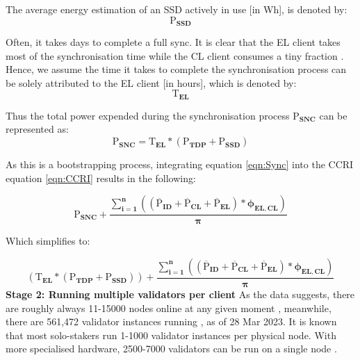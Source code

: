 The average energy estimation of an SSD actively in use [in Wh], is denoted by:
 \begin{equation*}
    \boldsymbol{\mathrm{P}_{SSD} } 
\end{equation*}

Often, it takes days to complete a full sync. It is clear that the EL client takes most of the synchronisation time while the CL client consumes a tiny fraction \cite{Ethereum/go-ethereum:Protocol}. Hence, we assume the time it takes to complete the synchronisation process can be solely attributed to the EL client [in hours], which is denoted by:
\begin{equation*}
    \boldsymbol{\mathrm{T}_{EL}}
\end{equation*}

Thus the total power expended during the synchronisation process $\boldsymbol{\mathrm{P}_{SNC}}$ can be represented as:
\begin{equation}
    \boldsymbol{\mathrm{P}_{SNC} = \mathrm{T}_{EL} * \left({\mathrm{P}_{TDP}} + \mathrm{P}_{SSD}\right)} \label{eqn:Sync}
\end{equation}

As this is a bootstrapping process, integrating equation \ref{eqn:Sync} into the CCRI equation \ref{eqn:CCRI} results in the following:

\begin{equation*}
    \boldsymbol{\mathrm{P}_{SNC} +  {\frac{\displaystyle\sum\limits_{i=1}^{n}{ \left({\left(\mathrm{\overline{P}}_{ID} + \mathrm{\overline{P}}_{CL} + \mathrm{\overline{P}}_{EL}\right)} * {\phi_{EL,CL}} \right)}}
 {\pi}} } 
\end{equation*}

Which simplifies to:

\begin{equation}
     \boldsymbol{\left({\mathrm{T}_{EL} * \left({\mathrm{P}_{TDP}} + \mathrm{P}_{SSD}\right)}\right) +  {\frac{\displaystyle\sum\limits_{i=1}^{n}{ \left({\left(\mathrm{\overline{P}}_{ID} + \mathrm{\overline{P}}_{CL} + \mathrm{\overline{P}}_{EL}\right)} * {\phi_{EL,CL}} \right)}}
{\pi}} } \label{eqn:CCRISync}
\end{equation}
\label{AdditonalNodesReasoning}
\textbf{ Stage 2: Running multiple validators per client}
As the data suggests, there are roughly always 11-15000 nodes online at any given moment \cite{NodewatchAnalytics}, meanwhile, there are 561,472 validator instances running \cite{EthereumEthereum.orgc}, as of 28 Mar 2023. It is known that most solo-stakers run 1-1000 validator instances per physical node. With more specialised hardware, 2500-7000 validators can be run on a single node \cite{Kaushal2022ValidatingConference}. 

